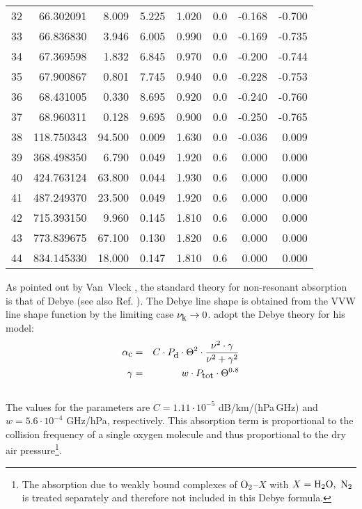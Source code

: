 \begin{longtable}{lrrrrrrr}
32 & 66.302091 &   8.009 &  5.225 &    1.020 & 0.0 &  -0.168 &   -0.700\\
33 & 66.836830 &   3.946 &  6.005 &    0.990 & 0.0 &  -0.169 &   -0.735\\
34 & 67.369598 &   1.832 &  6.845 &    0.970 & 0.0 &  -0.200 &   -0.744\\
35 & 67.900867 &   0.801 &  7.745 &    0.940 & 0.0 &  -0.228 &   -0.753\\
36 & 68.431005 &   0.330 &  8.695 &    0.920 & 0.0 &  -0.240 &   -0.760\\
37 & 68.960311 &   0.128 &  9.695 &    0.900 & 0.0 &  -0.250 &   -0.765\\
38 & 118.750343 &  94.500 &  0.009 &   1.630 & 0.0 &  -0.036 &    0.009\\
39 & 368.498350 &   6.790 &  0.049 &   1.920 & 0.6 &   0.000 &    0.000\\
40 & 424.763124 &  63.800 &  0.044 &   1.930 & 0.6 &   0.000 &    0.000\\
41 & 487.249370 &  23.500 &  0.049 &   1.920 & 0.6 &   0.000 &    0.000\\
42 & 715.393150 &   9.960 &  0.145 &   1.810 & 0.6 &   0.000 &    0.000\\
43 & 773.839675 &  67.100 &  0.130 &   1.820 & 0.6 &   0.000 &    0.000\\
44 & 834.145330 &  18.000 &  0.147 &   1.810 & 0.6 &   0.000 &    0.000\\
\end{longtable}

\label{levele:mpm93_o2cont}
As pointed out by Van~Vleck \cite{vv:87}, the standard theory for
non-resonant absorption is that of Debye (see also Ref. \cite{townes:55}). 
The Debye line shape is obtained from the VVW line shape function 
by the limiting case $\nu_{\mbox{\rm \small k}} \rightarrow 0$.
\cite{liebeetal:93} adopt the Debye theory for his model:
\begin{eqnarray}
  \label{eq:mpm93_o2cont}
  \alphac &=&  C \cdot \pda \cdot \Theta^2 \cdot 
               \frac{\nu^2 \cdot \gamma}{\nu^2+\gamma^2}\\
%
  \label{eq:mpm93_o2cont_1}
  \gamma  &=&  w \cdot \ptot \cdot \Theta^{0.8}\nonumber\\
\nonumber
\end{eqnarray}
The values for the parameters are $C = 1.11\cdot 10^{-5}$ dB/km/(hPa\,GHz) and 
$w = 5.6 \cdot 10^{-4}$ GHz/hPa, respectively. This absorption
term is proportional to the collision frequency of a single oxygen molecule
and thus proportional to the dry air pressure\footnote{The absorption
  due to weakly bound complexes of $\mbox{O}_2$--$X$ with $X=\mbox{H}_2\mbox{O},~\mbox{N}_2$ is 
  treated separately and therefore not included in this Debye
  formula.}.




